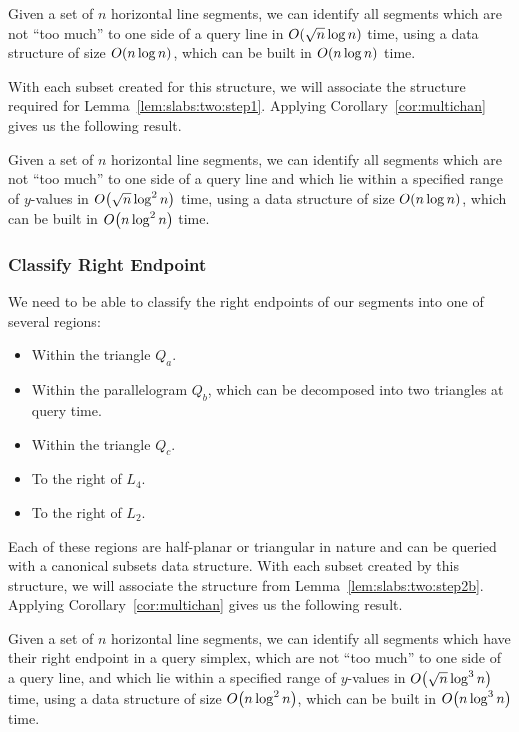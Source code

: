 \begin{lemma}
\label{lem:slabs:two:step2a}
Given a set of $n$ horizontal line segments, we can identify all segments which are not ``too much'' to one side of a query line in $O\!\left(\sqrt{n}\log{n}\right)$ time, using a data structure of size $O\!\left(n\log{n}\right)$, which can be built in $O\!\left(n\log{n}\right)$ time.
\end{lemma}

With each subset created for this structure, we will associate the structure required for Lemma~\ref{lem:slabs:two:step1}.
Applying Corollary~\ref{cor:multichan} gives us the following result.

\begin{lemma}
\label{lem:slabs:two:step2b}
Given a set of $n$ horizontal line segments, we can identify all segments which are not ``too much'' to one side of a query line and which lie within a specified range of $y$-values in $O\!\left(\sqrt{n}\log^2{n}\right)$ time, using a data structure of size $O\!\left(n\log{n}\right)$, which can be built in $O\!\left(n\log^2{n}\right)$ time.
\end{lemma}


\subsubsection{Classify Right Endpoint}

We need to be able to classify the right endpoints of our segments into one of several regions:
\begin{itemize}
 \item Within the triangle $Q_a$.
 \item Within the parallelogram $Q_b$, which can be decomposed into two triangles at query time.
 \item Within the triangle $Q_c$.
 \item To the right of $L_4$.
 \item To the right of $L_2$.
\end{itemize}

Each of these regions are half-planar or triangular in nature and can be queried with a canonical subsets data structure. 
With each subset created by this structure, we will associate the structure from Lemma~\ref{lem:slabs:two:step2b}. 
Applying Corollary~\ref{cor:multichan} gives us the following result.

\begin{lemma}
\label{lem:slabs:two:step3}
Given a set of $n$ horizontal line segments, we can identify all segments which have their right endpoint in a query simplex, which are not ``too much'' to one side of a query line, and which lie within a specified range of $y$-values in $O\!\left(\sqrt{n}\log^3{n}\right)$ time, using a data structure of size $O\!\left(n\log^2{n}\right)$, which can be built in $O\!\left(n\log^3{n}\right)$ time.
\end{lemma}


